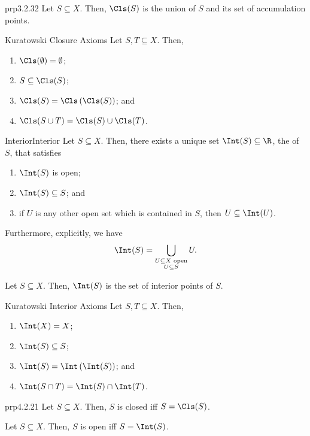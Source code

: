 \begin{prp}{}{prp3.2.32}
Let $S\subseteq X$.  Then, $\Cls (S)$ is the union of $S$ and its set of accumulation points.
\end{prp}
\begin{thm}{Kuratowski Closure Axioms}{}
Let $S,T\subseteq X$.  Then,
\begin{enumerate}
\item $\Cls (\emptyset) =\emptyset$;
\item $S\subseteq \Cls (S)$;
\item $\Cls (S)=\Cls \left( \Cls (S)\right)$; and
\item $\Cls (S\cup T)=\Cls (S)\cup \Cls (T)$.
\end{enumerate}
\end{thm}
\begin{prp}{Interior}{Interior}
Let $S\subseteq X$.  Then, there exists a unique set $\Int (S)\subseteq \R$, the  of $S$, that satisfies
\begin{enumerate}
\item $\Int (S)$ is open;
\item $\Int (S)\subseteq S$; and
\item if $U$ is any other open set which is contained in $S$, then $U\subseteq \Int (U)$.
\end{enumerate}
Furthermore, explicitly, we have
\begin{equation}
\Int (S)=\bigcup _{\substack{U\subseteq X\text{ open} \\ U\subseteq S}}U.
\end{equation}
\end{prp}
\begin{prp}{}{}
Let $S\subseteq X$.  Then, $\Int (S)$ is the set of interior points of $S$.
\end{prp}
\begin{thm}{Kuratowski Interior Axioms}{}
Let $S,T\subseteq X$.  Then,
\begin{enumerate}
\item $\Int (X)=X$;
\item $\Int (S)\subseteq S$;
\item $\Int (S)=\Int \left( \Int (S)\right)$; and
\item $\Int (S\cap T)=\Int (S)\cap \Int (T)$.
\end{enumerate}
\end{thm}
\begin{prp}{}{prp4.2.21}
Let $S\subseteq X$.  Then, $S$ is closed iff $S=\Cls (S)$.
\end{prp}
\begin{prp}{}{}
Let $S\subseteq X$.  Then, $S$ is open iff $S=\Int (S)$.
\end{prp}

